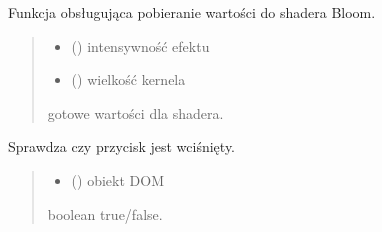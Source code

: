 \documentclass[a4paper,10pt,openany,english]{sphinxmanual}
\begin{document}

\begin{fulllineitems}
\label{\detokenize{js/js-functions:bloom}}
\pysigstartsignatures
\pysiglinewithargsret
{}
{\sphinxparamcomma {}}
{}
\pysigstopsignatures
\sphinxAtStartPar
Funkcja obsługująca pobieranie wartości do shadera Bloom.
\begin{quote}\begin{description}
\begin{itemize}
\item {} 
\sphinxAtStartPar
{} () \textendash{} intensywność efektu

\item {} 
\sphinxAtStartPar
{} () \textendash{} wielkość kernela

\end{itemize}

\sphinxAtStartPar
gotowe wartości dla shadera.

\end{description}\end{quote}

\end{fulllineitems}


\begin{fulllineitems}
\label{\detokenize{js/js-functions:isChecked}}
\pysigstartsignatures
\pysiglinewithargsret
{}
{}
{}
\pysigstopsignatures
\sphinxAtStartPar
Sprawdza czy przycisk jest wciśnięty.
\begin{quote}\begin{description}
\begin{itemize}
\item {} 
\sphinxAtStartPar
{} () \textendash{} obiekt DOM

\end{itemize}

\sphinxAtStartPar
boolean true/false.

\end{description}\end{quote}

\end{fulllineitems}
\end{document}
